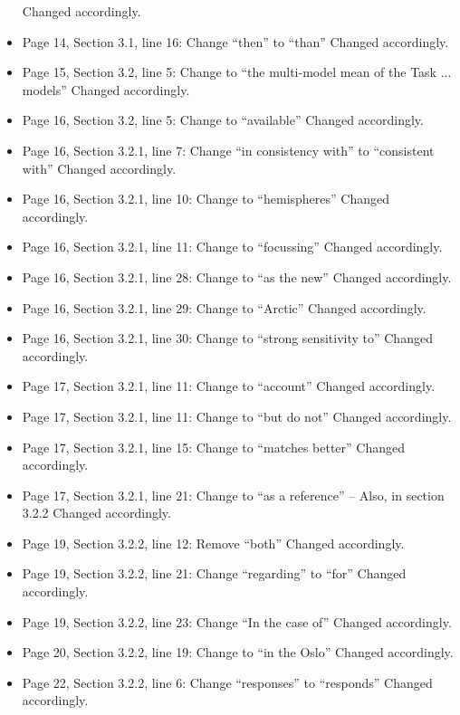 \begin{itemize}
  Changed accordingly.
\item {\color{blue}Page 14, Section 3.1, line 16: Change “then” to “than”}
  Changed accordingly.
\item {\color{blue}Page 15, Section 3.2, line 5: Change to “the multi-model mean of the Task ... models”}
  Changed accordingly.
\item {\color{blue}Page 16, Section 3.2, line 5: Change to “available”}
  Changed accordingly.
\item {\color{blue}Page 16, Section 3.2.1, line 7: Change “in consistency with” to “consistent with”}
  Changed accordingly.
\item {\color{blue}Page 16, Section 3.2.1, line 10: Change to “hemispheres”}
  Changed accordingly.
\item {\color{blue}Page 16, Section 3.2.1, line 11: Change to “focussing”}
  Changed accordingly.
\item {\color{blue}Page 16, Section 3.2.1, line 28: Change to “as the new”}
  Changed accordingly.
\item {\color{blue}Page 16, Section 3.2.1, line 29: Change to “Arctic”}
  Changed accordingly.
\item {\color{blue}Page 16, Section 3.2.1, line 30: Change to “strong sensitivity to”}
  Changed accordingly.
\item {\color{blue}Page 17, Section 3.2.1, line 11: Change to “account”}
  Changed accordingly.
\item {\color{blue}Page 17, Section 3.2.1, line 11: Change to “but do not”}
  Changed accordingly.
\item {\color{blue}Page 17, Section 3.2.1, line 15: Change to “matches better”}
  Changed accordingly.
\item {\color{blue}Page 17, Section 3.2.1, line 21: Change to “as a reference” – Also, in section 3.2.2}
  Changed accordingly.
\item {\color{blue}Page 19, Section 3.2.2, line 12: Remove “both”}
  Changed accordingly.
\item {\color{blue}Page 19, Section 3.2.2, line 21: Change “regarding” to “for”}
  Changed accordingly.
\item {\color{blue}Page 19, Section 3.2.2, line 23: Change “In the case of”}
  Changed accordingly.
\item {\color{blue}Page 20, Section 3.2.2, line 19: Change to “in the Oslo”}
  Changed accordingly.
\item {\color{blue}Page 22, Section 3.2.2, line 6: Change “responses” to “responds”}
  Changed accordingly.

\end{itemize}
